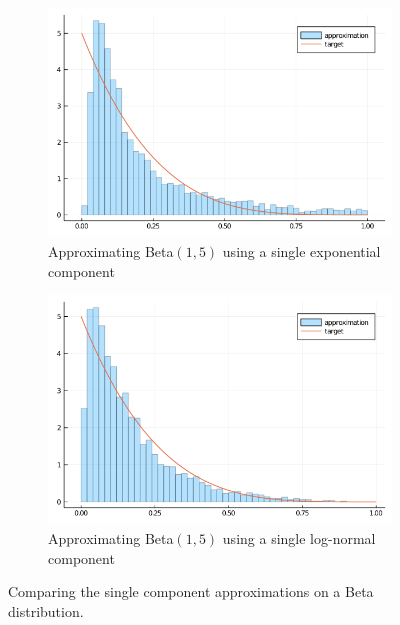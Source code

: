 \begin{figure}[H]
\centering
\begin{subfigure}{0.45\textwidth}
\includegraphics[width=1\linewidth]{../../plot/exp_single.png}
\caption{Approximating Beta$(1,5)$ using a single exponential component}
\end{subfigure}
\begin{subfigure}{0.45\textwidth}
\includegraphics[width=1\linewidth]{../../plot/gauss_single.png}
\caption{Approximating Beta$(1,5)$ using a single log-normal component}
\end{subfigure}
\caption{Comparing the single component approximations on a Beta distribution.}
\label{fig:extension.single}
\end{figure}

